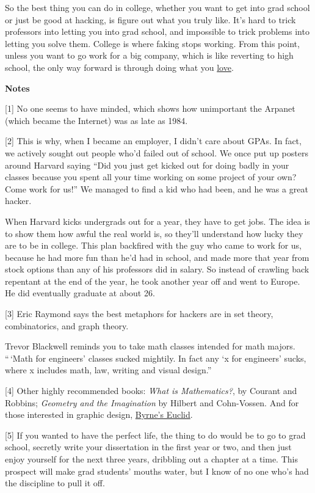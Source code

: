 So the best thing you can do in college, whether you want to get into
grad school or just be good at hacking, is figure out what you truly
like. It's hard to trick professors into letting you into grad school,
and impossible to trick problems into letting you solve them. College is
where faking stops working. From this point, unless you want to go work
for a big company, which is like reverting to high school, the only way
forward is through doing what you \href{love.html}{love}.

\textbf{Notes}

{[}1{]} No one seems to have minded, which shows how unimportant the
Arpanet (which became the Internet) was as late as 1984.

{[}2{]} This is why, when I became an employer, I didn't care about
GPAs. In fact, we actively sought out people who'd failed out of school.
We once put up posters around Harvard saying ``Did you just get kicked
out for doing badly in your classes because you spent all your time
working on some project of your own? Come work for us!'' We managed to
find a kid who had been, and he was a great hacker.

When Harvard kicks undergrads out for a year, they have to get jobs. The
idea is to show them how awful the real world is, so they'll understand
how lucky they are to be in college. This plan backfired with the guy
who came to work for us, because he had more fun than he'd had in
school, and made more that year from stock options than any of his
professors did in salary. So instead of crawling back repentant at the
end of the year, he took another year off and went to Europe. He did
eventually graduate at about 26.

{[}3{]} Eric Raymond says the best metaphors for hackers are in set
theory, combinatorics, and graph theory.

Trevor Blackwell reminds you to take math classes intended for math
majors. ``\,`Math for engineers' classes sucked mightily. In fact any `x
for engineers' sucks, where x includes math, law, writing and visual
design.''

{[}4{]} Other highly recommended books: \emph{What is Mathematics?}, by
Courant and Robbins; \emph{Geometry and the Imagination} by Hilbert and
Cohn-Vossen. And for those interested in graphic design,
\href{http://www.math.ubc.ca/people/faculty/cass/Euclid/byrne.html}{Byrne's
Euclid}.

{[}5{]} If you wanted to have the perfect life, the thing to do would be
to go to grad school, secretly write your dissertation in the first year
or two, and then just enjoy yourself for the next three years, dribbling
out a chapter at a time. This prospect will make grad students' mouths
water, but I know of no one who's had the discipline to pull it off.

